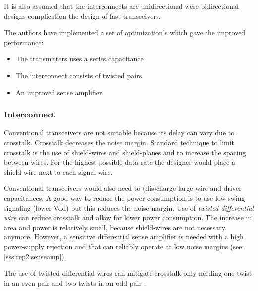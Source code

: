 It is also assumed that the interconnects are unidirectional were bidirectional designs complication the design of fast transceivers.

The authors have implemented a set of optimization's which gave the improved performance:
\begin{itemize}
    \item The transmitters uses a series capacitance
    \item The interconnect consists of twisted pairs
    \item An improved sense amplifier
\end{itemize}


\subsubsection{Interconnect} \label{sss:rep2:interconnect}
Conventional transceivers are not suitable because its delay can vary due to crosstalk.
Crosstalk decreases the noise margin.
Standard technique to limit crosstalk is the use of shield-wires and shield-planes and to increase the spacing between wires.
For the highest possible data-rate the designer would place a shield-wire next to each signal wire.


Conventional transceivers would also need to (dis)charge large wire and driver capacitances.
A good way to reduce the power consumption is to use low-swing signaling (lower Vdd) but this reduces the noise margin.
Use of \textit{twisted differential wire} can reduce crosstalk and allow for lower power consumption. 
The increase in area and power is relatively small, because shield-wires are not necessary anymore.
However, a sensitive differential sense amplifier is needed with a high power-supply rejection and that can reliably operate at low noise margins (see: \cref{sss:rep2:senseamp}).

The use of twisted differential wires can mitigate crosstalk only needing one twist in an even pair and two twists in an odd pair \cite{mensink2007optimal}.


